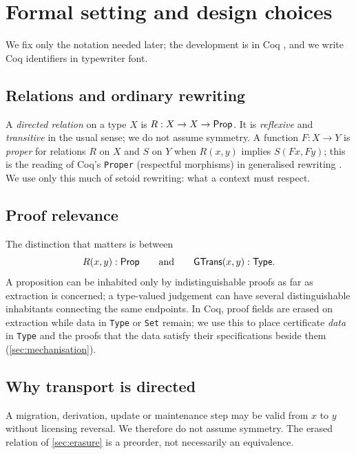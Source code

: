 \section{Formal setting and design choices}\label{sec:setting}

We fix only the notation needed later; the development is in Coq \cite{coq818}, and we write Coq identifiers in typewriter font.

\subsection{Relations and ordinary rewriting}
A \emph{directed relation} on a type $X$ is $R : X \to X \to \mathsf{Prop}$. It is \emph{reflexive} and \emph{transitive} in the usual sense; we do not assume symmetry. A function $F : X \to Y$ is \emph{proper} for relations $R$ on $X$ and $S$ on $Y$ when $R(x,y)$ implies $S(F x, F y)$; this is the reading of Coq's \texttt{Proper} (respectful morphisms) in generalised rewriting \cite{sozeau2009}. We use only this much of setoid rewriting: what a context must respect.

\subsection{Proof relevance}
The distinction that matters is between
\[
R(x,y) : \mathsf{Prop} \qquad\text{and}\qquad \mathsf{GTrans}(x,y) : \mathsf{Type}.
\]
A proposition can be inhabited only by indistinguishable proofs as far as extraction is concerned; a type-valued judgement can have several distinguishable inhabitants connecting the same endpoints. In Coq, proof fields are erased on extraction while data in \texttt{Type} or \texttt{Set} remain; we use this to place certificate \emph{data} in \texttt{Type} and the proofs that the data satisfy their specifications beside them (\cref{sec:mechanisation}).

\subsection{Why transport is directed}
A migration, derivation, update or maintenance step may be valid from $x$ to $y$ without licensing reversal. We therefore do not assume symmetry. The erased relation of \cref{sec:erasure} is a preorder, not necessarily an equivalence.

